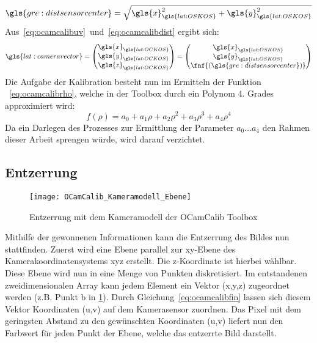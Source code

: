 \begin{equation}
\label{eq:ocamcalibdist}
\gls{gre:distsensorcenter}=\sqrt{\gls{x}_{\gls{lat:OSKOS}}^2+\gls{y}_{\gls{lat:OSKOS}}^2}
\end{equation}
Aus~\eqref{eq:ocamcalibuv}~und~\eqref{eq:ocamcalibdist} ergibt sich: 
\begin{equation}
\label{eq:ocamcalibfin}
\gls{lat:cameravector} =
\begin{pmatrix}
\gls{x}_{\gls{lat:OCKOS}} \\ \gls{y}_{\gls{lat:OCKOS}} \\ \gls{z}_{\gls{lat:OCKOS}}
\end{pmatrix}
=
\begin{pmatrix}
\gls{x}_{\gls{lat:OSKOS}} \\ \gls{y}_{\gls{lat:OSKOS}} \\ \fnf{(\gls{gre:distsensorcenter})}
\end{pmatrix}
\end{equation}
Die Aufgabe der Kalibration besteht nun im Ermitteln der Funktion ~\eqref{eq:ocamcalibrho}, welche in der Toolbox durch ein Polynom 4. Grades approximiert wird:
\begin{equation}
\label{eq:ocamcalibrho}
 f(\rho) = a_0 + a_1 \rho + a_2 \rho^2 + a_3 \rho^3 + a_4 \rho^4
\end{equation}
Da ein Darlegen des Prozesses zur Ermittlung der Parameter \(a_0 \dots a_4 \)  den Rahmen dieser Arbeit sprengen würde, wird darauf verzichtet.

\subsection{Entzerrung}

\begin{figure}[H]
  \centering
  \texttt{[image: OCamCalib\_Kameramodell\_Ebene]}
  \caption{Entzerrung mit dem Kameramodell der OCamCalib Toolbox}
  \label{fig:kameramodell_entzerrung}
\end{figure}

Mithilfe der gewonnenen Informationen kann die Entzerrung des Bildes nun stattfinden. Zuerst wird eine Ebene parallel zur xy-Ebene des Kamerakoordinatensystems xyz erstellt. Die z-Koordinate ist hierbei wählbar. Diese Ebene wird nun in eine Menge von Punkten diskretisiert. Im entstandenen zweidimensionalen Array kann jedem Element ein Vektor (x,y,z) zugeordnet werden  (z.B. Punkt b in \ref{fig:kameramodell_entzerrung}). Durch Gleichung~\eqref{eq:ocamcalibfin} lassen sich diesem Vektor Koordinaten (u,v) auf dem Kamerasensor zuordnen. Das Pixel mit dem geringsten Abstand zu den gewünschten Koordinaten (u,v) liefert nun den Farbwert für jeden Punkt der Ebene, welche das entzerrte Bild darstellt.

